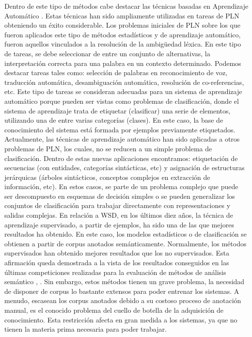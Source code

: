Dentro de este tipo de métodos cabe destacar las técnicas basadas en Aprendizaje Automático \cite{016}. Estas técnicas han sido ampliamente utilizadas en tareas de PLN obteniendo un éxito considerable. Los problemas iniciales de PLN sobre los que fueron aplicados este tipo de métodos estadísticos y de aprendizaje automático, fueron aquellos vinculados a la resolución de la ambigüedad léxica. En este tipo de tareas, se debe seleccionar de entre un conjunto de alternativas, la interpretación correcta para una palabra en un contexto determinado. Podemos destacar tareas tales como: selección de palabras en reconocimiento de voz, traducción automática, desambiguación automática, resolución de co-referencias, etc. Este tipo de tareas se consideran adecuadas para un sistema de aprendizaje automático porque pueden ser vistas como problemas de clasificación, donde el sistema de aprendizaje trata de etiquetar (clasificar) una serie de elementos, utilizando una de entre varias categorías (clases). En este caso, la base de conocimiento del sistema está formada por ejemplos previamente etiquetados. Actualmente, las técnicas de aprendizaje automático han sido aplicadas a otros problemas de PLN, los cuales, no se reducen a un simple problema de clasificación. Dentro de estas nuevas aplicaciones encontramos: etiquetación de secuencias (con entidades, categorías sintácticas, etc) y asignación de estructuras jerárquicas (árboles sintácticos, conceptos complejos en extracción de información, etc). En estos casos, se parte de un problema complejo que puede ser descompuesto en esquemas de decisión simples o se pueden generalizar los conjuntos de clasificación para trabajar directamente con representaciones y salidas complejas. En relación a WSD, en los últimos diez años, la técnica de aprendizaje supervisado, a partir de ejemplos, ha sido una de las que mejores resultados ha obtenido. En este caso, los modelos estadísticos o de clasificación se obtienen a partir de corpus anotados semánticamente. Normalmente, los métodos supervisados han obtenido mejores resultados que los no supervisados. Esta afirmación queda demostrada a la vista de los resultados conseguidos en las últimas competiciones realizadas para la evaluación de métodos de análisis semántico \cite{017}, \cite{018}. Sin embargo, estos métodos tienen un grave problema, la necesidad de disponer de corpus lo bastante extensos para poder entrenar los sistemas. A menudo, escasean los corpus anotados debido a su costoso proceso de anotación manual, es el conocido problema del cuello de botella de la adquisición de conocimiento. Esta restricción afecta en gran medida a los sistemas, ya que no tienen la materia prima necesaria para poder trabajar.

